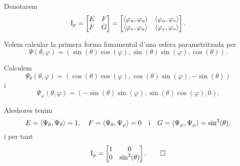 \documentclass[../../Main.tex]{subfiles}
\begin{document}
	\begin{notation}
		\label{notation:primera forma fonamental}
		Denotarem
		\[\I_{p}=\begin{bmatrix}
			E & F \\
			F & G
		\end{bmatrix}=
		\begin{bmatrix}
			\prodesc{\varphi_{u}}{\varphi_{u}} & \prodesc{\varphi_{u}}{\varphi_{v}} \\
			\prodesc{\varphi_{v}}{\varphi_{u}} & \prodesc{\varphi_{v}}{\varphi_{v}}
		\end{bmatrix}.\]
	\end{notation}
	\begin{example}
		\label{ex:primera forma fonamental d'una esfera de radi 1}
		Volem calcular la primera forma fonamental d'una esfera parametritzada per
		\[\Psi(\theta,\varphi)=(\sin(\theta)\cos(\varphi),\sin(\theta)\sin(\varphi),\cos(\theta)).\]
		\begin{solution}
			Calculem
			\[\Psi_{\theta}(\theta,\varphi)=(\cos(\theta)\cos(\varphi),\cos(\theta)\sin(\varphi),-\sin(\theta))\]
			i
			\[\Psi_{\varphi}(\theta,\varphi)=(-\sin(\theta)\sin(\varphi),\sin(\theta)\cos(\varphi),0).\]
			
			Aleshores tenim
			\[E=\prodesc{\Psi_{\theta}}{\Psi_{\theta}}=1,\quad F=\prodesc{\Psi_{\theta}}{\Psi_{\varphi}}=0\quad\text{i}\quad G=\prodesc{\Psi_{\varphi}}{\Psi_{\varphi}}=\sin^{2}(\theta),\]
			i per tant
			\[\I_{p}=\begin{bmatrix}
				1 & 0 \\
				0 & \sin^{2}(\theta)
			\end{bmatrix}.\qedhere\]
		\end{solution}
	\end{example}
\end{document}
